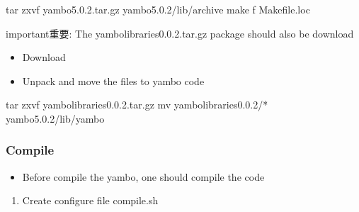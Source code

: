 \documentclass[a4paper,12pt,english]{sphinxmanual}
\begin{document}
\begin{sphinxVerbatim}[commandchars=\\\{\}]
tar zxvf yambo\PYGZhy{}5.0.2.tar.gz   yambo\PYGZhy{}5.0.2/lib/archive  
    make \PYGZhy{}f Makefile.loc
\end{sphinxVerbatim}

\begin{sphinxadmonition}{important}{重要:}
\sphinxAtStartPar
The yambo\sphinxhyphen{}libraries\sphinxhyphen{}0.0.2.tar.gz package should also be download
\end{sphinxadmonition}
\begin{itemize}
\item {} 
\sphinxAtStartPar
Download %
\begin{footnote}[22]\sphinxAtStartFootnote
{}
%
\end{footnote}

\item {} 
\sphinxAtStartPar
Unpack and move the files to yambo code

\end{itemize}

\begin{sphinxVerbatim}[commandchars=\\\{\}]
tar zxvf yambo\PYGZhy{}libraries\PYGZhy{}0.0.2.tar.gz  
    mv yambo\PYGZhy{}libraries\PYGZhy{}0.0.2/* yambo\PYGZhy{}5.0.2/lib/yambo
\end{sphinxVerbatim}


\subsubsection{Compile}
\label{\detokenize{compile/yambo_5.0.2:compile}}\begin{itemize}
\item {} 
\sphinxAtStartPar
Before compile the yambo, one should compile the {\hyperref[\detokenize{compile/hdf5_1.12.0::doc}]{}} code

\end{itemize}
\begin{enumerate}
%
\item {} 
\sphinxAtStartPar
Create configure file compile.sh

\end{enumerate}
\end{document}
